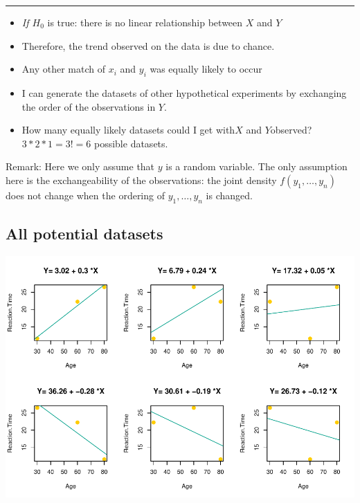 \documentclass[]{article}
\providecommand{\tightlist}{%
  \setlength{\itemsep}{0pt}\setlength{\parskip}{0pt}}
\begin{document}
\begin{center}\rule{0.5\linewidth}{\linethickness}\end{center}

\begin{itemize}
\tightlist
\item
  \emph{If \(H_0\)} is true: there is no linear relationship between
  \(X\) and \(Y\)
\item
  Therefore, the trend observed on the data is due to chance.
\item
  Any other match of \(x_i\) and \(y_i\) was equally likely to occur
\item
  I can generate the datasets of other hypothetical experiments by
  exchanging the order of the observations in \(Y\).
\item
  How many equally likely datasets could I get with\(X\) and
  \(Y\)observed? \(3 * 2 * 1=3!=6\) possible datasets.
\end{itemize}

Remark: Here we only assume that \(y\) is a random variable. The only
assumption here is the exchangeability of the observations: the joint
density \(f(y_1,\ldots,y_n)\) does not change when the ordering of
\(y_1,\ldots,y_n\) is changed.

\subsection{All potential datasets}\label{all-potential-datasets}

\begin{center}\includegraphics{inference_booklet_files/figure-latex/unnamed-chunk-8-1} \end{center}
\end{document}
